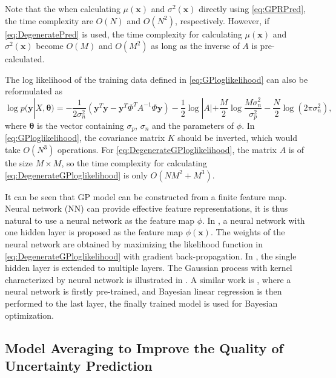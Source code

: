 Note that the when calculating $\mu(\bm{x})$ and $\sigma^2(\bm{x})$ directly using \eqref{eq:GPRPred}, the time complexity are $O(N)$ and $O(N^2)$, respectively. However, if \eqref{eq:DegeneratePred} is used, the time complexity for calculating $\mu(\bm{x})$ and $\sigma^2(\bm{x})$ become $O(M)$ and $O(M^2)$ as long as the inverse of $A$ is pre-calculated.

The log likelihood of the training data defined in \eqref{eq:GPloglikelihood} can also be reformulated as \cite{lazaro2010marginalized}
\begin{equation}
    \label{eq:DegenerateGPloglikelihood}
    \log p(\bm{y} | X, \bm{\theta}) = -\frac{1}{2\sigma_n^2}(\bm{y}^T\bm{y} - \bm{y}^T \Phi^T A^{-1} \Phi \bm{y}) - \frac{1}{2}\log |A| + \frac{M}{2} \log \frac{M \sigma_n^2}{\sigma_p^2} - \frac{N}{2} \log(2 \pi \sigma_n^2),
\end{equation}
where $\bm{\theta}$ is the vector containing $\sigma_p$, $\sigma_n$ and the parameters of $\phi$. In \eqref{eq:GPloglikelihood}, the covariance matrix $K$ should be inverted, which would take $O(N^3)$ operations. For \eqref{eq:DegenerateGPloglikelihood}, the matrix $A$ is of the size $M \times M$, so the time complexity for calculating \eqref{eq:DegenerateGPloglikelihood} is only $O(NM^2 + M^3)$.

It can be seen that GP model can be constructed from a finite feature map. Neural network (NN) can provide effective feature representations, it is thus natural to use a neural network as the feature map $\phi$. In \cite{lazaro2010marginalized}, a neural network with one hidden layer is proposed as the feature map $\phi(\bm{x})$. The weights of the neural network are obtained by maximizing the likelihood function in \eqref{eq:DegenerateGPloglikelihood} with gradient back-propagation. In \cite{huang2015scalable}, the single hidden layer is extended to multiple layers. The Gaussian process with kernel characterized by neural network is illustrated in . A similar work is \cite{snoek2015scalable}, where a neural network is firstly pre-trained, and Bayesian linear regression is then performed to the last layer, the finally trained model is used for Bayesian optimization.

\subsection{Model Averaging to Improve the Quality of Uncertainty Prediction}\label{sec:deepensemble}

